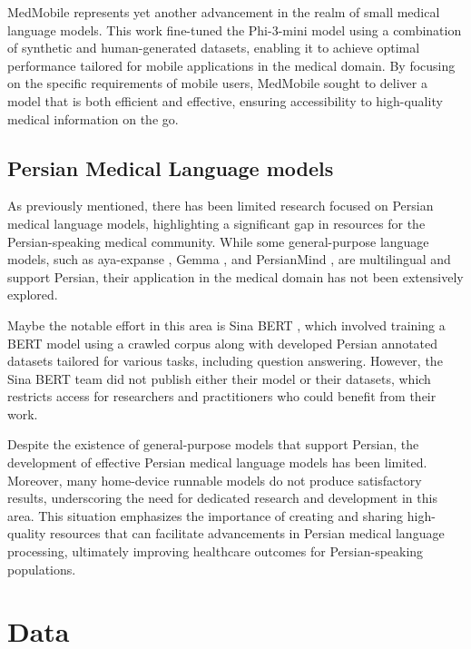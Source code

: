 \documentclass[conference]{IEEEtran}
\begin{document}
MedMobile
\cite{b9}
represents yet another advancement in the realm of small medical language models. This work fine-tuned the Phi-3-mini model
\cite{b10}
using a combination of synthetic and human-generated datasets, enabling it to achieve optimal performance tailored for mobile applications in the medical domain. By focusing on the specific requirements of mobile users, MedMobile sought to deliver a model that is both efficient and effective, ensuring accessibility to high-quality medical information on the go.
\subsection{Persian Medical Language models}
As previously mentioned, there has been limited research focused on Persian medical language models, highlighting a significant gap in resources for the Persian-speaking medical community. While some general-purpose language models, such as aya-expanse
\cite{b5}
, Gemma
\cite{b11}
, and PersianMind
\cite{b12}
, are multilingual and support Persian, their application in the medical domain has not been extensively explored.

Maybe the notable effort in this area is Sina BERT
\cite{b4}
, which involved training a BERT model using a crawled corpus along with developed Persian annotated datasets tailored for various tasks, including question answering. However, the Sina BERT team did not publish either their model or their datasets, which restricts access for researchers and practitioners who could benefit from their work.

Despite the existence of general-purpose models that support Persian, the development of effective Persian medical language models has been limited. Moreover, many home-device runnable models do not produce satisfactory results, underscoring the need for dedicated research and development in this area. This situation emphasizes the importance of creating and sharing high-quality resources that can facilitate advancements in Persian medical language processing, ultimately improving healthcare outcomes for Persian-speaking populations.

\section{Data}
\end{document}
